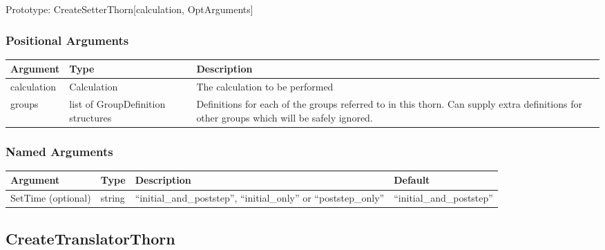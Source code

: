 \documentclass{report}
\newcommand{\tablewidth}{\textwidth}
\begin{document}
Prototype: CreateSetterThorn[calculation, OptArguments]

\subsubsection{Positional Arguments}

\begin{center}
\begin{tabularx}{\tablewidth}{|l|l|X|}
  \hline
  \bf Argument & \bf Type & \bf Description \\
  \hline
  calculation & Calculation & The calculation to be performed \\

  groups & list of GroupDefinition structures 

& Definitions for each of the groups referred to in this thorn. Can
  supply extra definitions for other groups which will be safely
  ignored. \\

  \hline
\end{tabularx}
\end{center}

\subsubsection{Named Arguments}

\begin{center}
\begin{tabularx}{\tablewidth}{|l|l|X|l|}
  \hline
  \bf Argument & \bf Type & \bf Description & \bf Default\\
  \hline
  SetTime (optional) & string & ``initial\_and\_poststep'', 
                     ``initial\_only''
                     or ``poststep\_only'' & ``initial\_and\_poststep'' \\
  \hline
\end{tabularx}
\end{center}



\subsection{CreateTranslatorThorn}
\label{app:CreateTranslatorThorn}
\end{document}
